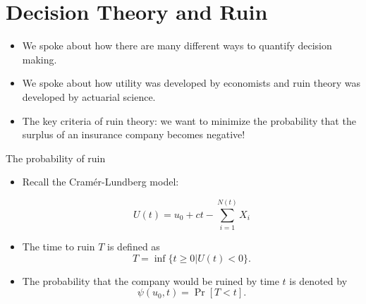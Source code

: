\documentclass[11pt]{beamer}
\begin{document}
\section{Decision Theory and Ruin}
\begin{frame}

\begin{itemize}

\item We spoke about how there are many different ways to quantify decision making. 

\vfill

\item We spoke about how utility was developed by economists and ruin theory was developed by actuarial science.

\vfill


\item The key criteria of ruin theory: we want to minimize the probability that the surplus of an insurance company becomes \alert{negative!}

\end{itemize}

\end{frame}
\begin{frame}{The probability of ruin}

\begin{itemize}

\item Recall the Cram\'er-Lundberg model:

$$U(t)= u_0+ct - \sum_{i=1}^{N(t)}X_i$$

\item The time to ruin $T$ is defined as
$$T=\inf \{ t\ge 0 | U(t)<0\}.$$

\item The probability that the company would be ruined by time $t$ is denoted by
$$\psi(u_0,t)=\Pr[T<t].$$

\end{itemize}

\end{frame}
\end{document}
